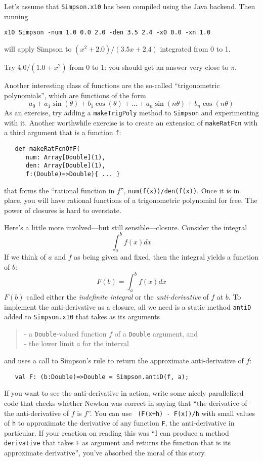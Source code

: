 Let's assume that {\tt Simpson.x10} has been compiled using the Java backend. 
Then running
\begin{verbatim}
x10 Simpson -num 1.0 0.0 2.0 -den 3.5 2.4 -x0 0.0 -xn 1.0
\end{verbatim}
will apply Simpson to $(x^{2} + 2.0) / (3.5x + 2.4)$ integrated from 0 to 1.
 
Try $4.0/(1.0 + x^{2})$ from 0 to 1: you should get an answer very close to $\pi$.

Another interesting class of functions are the
so-called ``trigonometric polynomials'', which are functions of the form
$$
a_0 + a_1 \sin(\theta) + b_1\cos(\theta) + \ldots + a_n\sin(n\theta) +
b_n\cos(n\theta)
$$
As an exercise, try adding a {\tt makeTrigPoly} method to {\tt Simpson} and experimenting
with it.  Another worthwhile exercise is to create an extension of {\tt makeRatFcn}
with a third argument that is a function {\tt f}:
\begin{verbatim}
   def makeRatFcnOfF(
      num: Array[Double](1), 
      den: Array[Double](1),
      f:(Double)=>Double){ ... }
\end{verbatim}
that forms the ``rational function in $f$'', {\tt num(f(x))/den(f(x))}.   Once it
is in place, you will have rational functions of a trigonometric polynomial
for free. The power of closures is hard to overstate.

Here's a little more involved---but still  sensible---closure.
Consider the integral 
$$\int_a^b f(x)dx$$
If we think of $a$ and $f$ as being given and fixed, then
the integral yields a function of $b$: 
$$F(b) = \int_a^b f(x)dx$$
$F(b)$ called
either the {\em indefinite integral} or the {\em anti-derivative} of $f$ at $b$.
To implement the anti-derivative as a closure, all we need is a static
method {\tt antiD} added to {\tt Simpson.x10} that takes as its arguments
\begin{quote}
- a {\tt Double}-valued function $f$ of a {\tt Double} argument, and\\
- the lower limit $a$ for the interval 
\end{quote}
and uses a call to Simpson's rule to return the approximate anti-derivative of
$f$:
\begin{verbatim}
   val F: (b:Double)=>Double = Simpson.antiD(f, a); 
\end{verbatim}

If you want to see the anti-derivative in action, write some nicely
parallelized code that checks whether Newton was correct in saying that ``the
derivative of the anti-derivative of $f$ is $f$''. You can use {\tt
(F(x+h) - F(x))/h} with small values of {\tt h} to approximate the derivative
of any function {\tt F}, the anti-derivative in particular.
If your reaction on reading this was ``I can produce a method
{\tt derivative} that takes {\tt F} as argument and returns the function that
is its approximate derivative'', you've absorbed the moral of this story.

